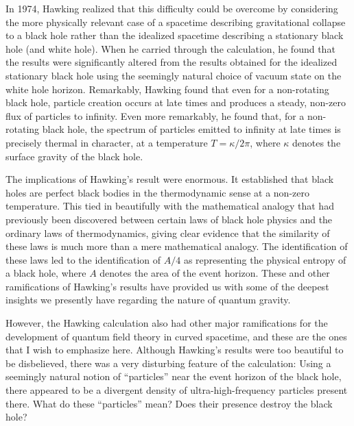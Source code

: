 \documentclass[12pt,epsf,amsfonts,amssymb]{article}
\begin{document}
In 1974, Hawking \cite{h1} realized that this difficulty could be
overcome by considering the more physically relevant case of a
spacetime describing gravitational collapse to a black hole rather
than the idealized spacetime describing a stationary black hole (and
white hole). When he carried through the calculation, he found that
the results were significantly altered from the results obtained
for the idealized stationary black hole using the seemingly natural
choice of vacuum state on the white hole horizon. Remarkably, Hawking found
that even for a non-rotating black hole, particle creation occurs at
late times and produces a steady, non-zero flux of particles to
infinity. Even more remarkably, he found that, for a non-rotating
black hole, the spectrum of particles emitted to infinity 
at late times is precisely
thermal in character, at a temperature $T = \kappa/2 \pi$, where
$\kappa$ denotes the surface gravity of the black hole.

The implications of Hawking's result were enormous. It established
that black holes are perfect black bodies in the thermodynamic sense
at a non-zero temperature. This tied in beautifully with the
mathematical analogy that had previously been discovered between certain
laws of black hole physics and the ordinary laws of thermodynamics,
giving clear evidence that the similarity of these laws is much more
than a mere mathematical analogy. The identification of these
laws led to the identification
of $A/4$ as representing the physical entropy of a black hole, where
$A$ denotes the area of the event horizon. These and other
ramifications of Hawking's results have provided us with some of the
deepest insights we presently have regarding the nature of quantum gravity.

However, the Hawking calculation also had other major ramifications
for the development of quantum field theory in curved spacetime, and
these are the ones that I wish to emphasize here.  Although Hawking's results
were too beautiful to be disbelieved, there was a very disturbing
feature of the calculation: Using a seemingly natural notion of
``particles'' near the event horizon of the black hole, there appeared to
be a divergent density of ultra-high-frequency
particles present there. What do these ``particles'' mean? Does
their presence destroy the black hole?
\end{document}

